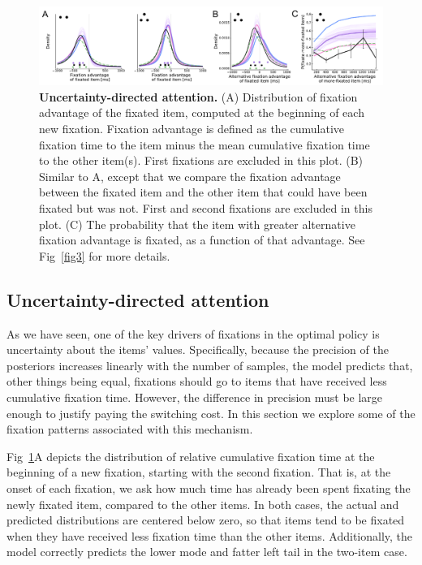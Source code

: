 \begin{figure}[ht!]
  \centering
  \includegraphics[width=\textwidth]{figs/attention/Fig5.pdf}
  \caption{\textbf{Uncertainty-directed attention.}
    (A) Distribution of fixation advantage of the fixated item, computed at the beginning of each new fixation. Fixation advantage is defined as the cumulative fixation time to the item  minus the mean cumulative fixation time to the other item(s). First fixations are excluded in this plot.
    (B) Similar to A, except that we compare the fixation advantage between the fixated item and the other item that could have been fixated but was not. First and second fixations are excluded in this plot.
    (C) The probability that the item with greater alternative fixation advantage is fixated, as a function of that advantage.
    See Fig~\ref{fig3} for more details.}
  \label{fig5}
\end{figure}

\subsection{Uncertainty-directed attention}

As we have seen, one of the key drivers of fixations in the optimal policy is uncertainty about the items' values. Specifically, because the precision of the posteriors increases linearly with the number of samples, the model predicts that, other things being equal, fixations should go to items that have received less cumulative fixation time. However, the difference in precision must be large enough to justify paying the switching cost. In this section we explore some of the fixation patterns associated with this mechanism.

Fig~\ref{fig5}A depicts the distribution of relative cumulative fixation time at the beginning of a new fixation, starting with the second fixation. That is, at the onset of each fixation, we ask how much time has already been spent fixating the newly fixated item, compared to the other items. In both cases, the actual and predicted distributions are centered below zero, so that items tend to be fixated when they have received less fixation time than the other items. Additionally, the model correctly predicts the lower mode and fatter left tail in the two-item case.

